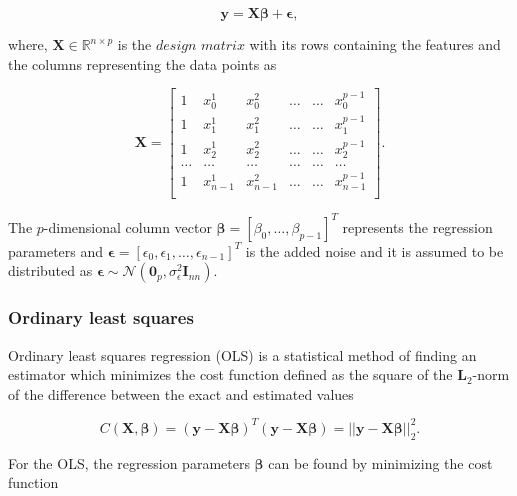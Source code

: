 \documentclass[a4paper]{article}
\begin{document}
\begin{equation}
    \mathbf{y} = \mathbf{X}\boldsymbol{\beta} + \boldsymbol{\epsilon},
    \label{linear1} 
\end{equation}

where, $\mathbf{X} \in \mathbb{R}^{n \times p}$ is the $design$ $matrix$ with its rows containing the features and the columns representing the data points as 

\begin{equation}
    \mathbf{X}= 
    \begin{bmatrix} 
    1& x_{0}^1 &x_{0}^2& \dots & \dots &x_{0}^{p-1}\\
    1& x_{1}^1 &x_{1}^2& \dots & \dots &x_{1}^{p-1}\\
    1& x_{2}^1 &x_{2}^2& \dots & \dots &x_{2}^{p-1}\\                      
    \dots& \dots &\dots& \dots & \dots &\dots\\
    1& x_{n-1}^1 &x_{n-1}^2& \dots & \dots &x_{n-1}^{p-1}\\
    \end{bmatrix} .
    \label{design1} 
\end{equation}


The $p$-dimensional column vector $\boldsymbol{\beta} = [\beta_0, \ldots,\beta_{p-1}]^{T}$ represents the regression parameters and $\boldsymbol{\epsilon}=[\epsilon_0,\epsilon_1,\dots,\epsilon_{n-1}]^{T}$ is the added noise and it is assumed to be distributed as $\boldsymbol{\epsilon} \sim \mathcal{N}(\mathbf{0}_p,\sigma_{\epsilon}^2\mathbf{I}_{nn})$.

\subsubsection{Ordinary least squares }
Ordinary least squares regression (OLS) is a statistical method of finding an estimator which minimizes the cost function defined as the square of the $\mathbf{L}_2$-norm of the difference between the exact and estimated values 

\begin{equation}
    C(\mathbf{X},\mathbf{\beta})=\left(\mathbf{y}-\mathbf{X}\mathbf{\beta}\right)^T\left(\mathbf{y}-\mathbf{X}\boldsymbol{\beta}\right)=\vert\vert\mathbf{y}-\mathbf{X}\boldsymbol{\beta}\vert\vert_2^2.
    \label{cost_OSL}
\end{equation}


For the OLS, the regression parameters $\boldsymbol{\beta}$ can be found by minimizing the cost function
\end{document}
